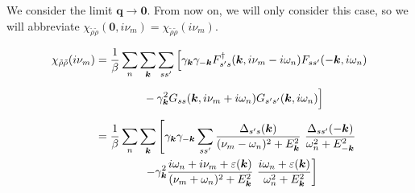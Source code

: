 \documentclass[a4j]{jsarticle}
\begin{document}
We consider the limit $\bm{q} \to \bm{0}$.
From now on, we will only consider this case, so we will abbreviate $\chi_{\tilde{\rho} \tilde{\rho}}(\bm{0},i \nu_{m}) = \chi_{\tilde{\rho} \tilde{\rho}}(i \nu_{m})$.

\begin{align}
	\chi_{\tilde{\rho} \tilde{\rho}}(i \nu_{m})
	 & =
	\dfrac{1}{\beta}
	\sum_{n}
	\sum_{ \bm{k} }
	\sum_{s s'}
	\Big[
		\gamma_{\bm{k}}
		\gamma_{-\bm{k}}
		F_{ s' s }^{\dagger}( \bm{k} , i \nu_{m} - i \omega_{n} )
		F_{ s s' } ( - \bm{k} , i \omega_{n} )
	\nonumber \\[2mm] & \hspace{15mm} -
	\gamma_{\bm{k}}^{2}
	G_{ s s } ( \bm{k} , i \nu_{m} + i \omega_{n} )
	G_{ s' s' } ( \bm{k} , i \omega_{n} )
	\Big]
	\nonumber \\[2mm]
	 & =
	\dfrac{1}{\beta}
	\sum_{n}
	\sum_{ \bm{k} }
	\left[
		\gamma_{\bm{k}}
		\gamma_{-\bm{k}}
		\sum_{s s'}
		\dfrac{ \Delta_{s' s}(\bm{k}) }{ ( \nu_{m} - \omega_{n} )^{2} + E_{\bm{k}}^{2} }
		\
		\dfrac{ \Delta_{s s'}(-\bm{k}) }{ \omega_{n}^{2} + E_{-\bm{k}}^{2} }
		\right.
	\nonumber \\ & \hspace{15mm} \left.
		-
		\gamma_{\bm{k}}^{2}
		\dfrac{ i \omega_{n} + i \nu_{m} + \varepsilon(\bm{k}) }{ ( \nu_{m} + \omega_{n} )^{2} + E_{\bm{k}}^{2} }
		\
		\dfrac{ i \omega_{n} + \varepsilon(\bm{k}) }{ \omega_{n}^{2} + E_{\bm{k}}^{2} }
		\right]
\end{align}
\end{document}
